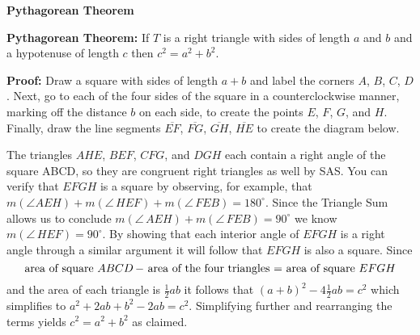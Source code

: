 \documentclass[12pt]{article}
\begin{document}
\begin{center}
\Large{\textbf{Pythagorean Theorem}}
\end{center}
\textbf{Pythagorean Theorem:} If $T$ is a right triangle with sides of length
$a$ and $b$ and a hypotenuse of length $c$ then $c^2=a^2+b^2$.

\noindent\textbf{Proof:} Draw a square with sides of length $a+b$ and label
the corners $A$, $B$, $C$, $D$.  Next, go to each of the four sides of the 
square in a counterclockwise manner, marking off the distance $b$ on each side,
to create the points $E$, $F$, $G$, and $H$. Finally, draw the line segments $\overline{EF}$, $\overline{FG}$,
$\overline{GH}$, $\overline{HE}$ to create the diagram below.

\begin{center}
\end{center}

The triangles $AHE$, $BEF$, $CFG$, and $DGH$ each contain a right angle
of the square ABCD, so they are congruent right triangles as well by SAS. 
You can verify that $EFGH$ is a square by observing, for example, that $m(\angle AEH)+m(\angle\, HEF) + m(\angle\, FEB) = 180^{\circ}$. Since the Triangle Sum allows us to conclude $m(\angle\, AEH)+m(\angle\, FEB) = 90^{\circ}$ we know $m(\angle\, HEF)= 90^{\circ}$. By showing that
each interior angle of $EFGH$ is a right angle through a similar argument 
it will follow that $EFGH$ is  also a square. Since 
$$\mbox{area of square $ABCD\, - $ area of the four triangles $ = $ area of square $EFGH$}$$
and the area of each triangle is $\frac{1}{2}ab$ it follows that 
$(a+b)^2 - 4\frac{1}{2}ab = c^2$ which simplifies to $a^2+2ab+b^2-2ab
=c^2$. Simplifying further and rearranging the terms yields $c^2=a^2+b^2$ as claimed.
\end{document}
